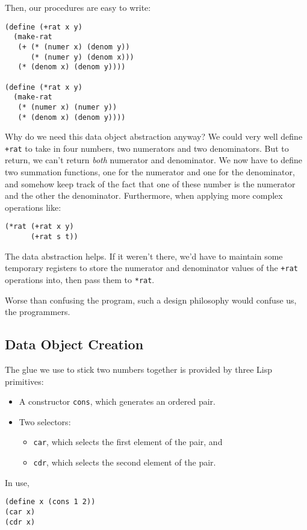 \documentclass[9pt]{report}
\begin{document}
Then, our procedures are easy to write:

\begin{verbatim}
(define (+rat x y)
  (make-rat
   (+ (* (numer x) (denom y))
      (* (numer y) (denom x)))
   (* (denom x) (denom y))))

(define (*rat x y)
  (make-rat
   (* (numer x) (numer y))
   (* (denom x) (denom y))))
\end{verbatim}

Why do we need this data object abstraction anyway? We could very
well define \texttt{+rat} to take in four numbers, two numerators and two
denominators. But to return, we can't return \emph{both} numerator and
denominator. We now have to define two summation functions, one for
the numerator and one for the denominator, and somehow keep track
of the fact that one of these number is the numerator and the other
the denominator. Furthermore, when applying more complex operations
like:

\begin{verbatim}
(*rat (+rat x y)
      (+rat s t))
\end{verbatim}

The data abstraction helps. If it weren't there, we'd have to
maintain some temporary registers to store the numerator and
denominator values of the \texttt{+rat} operations into, then pass them to
\texttt{*rat}.

Worse than confusing the program, such a design philosophy would
confuse us, the programmers.

\subsection{Data Object Creation}
\label{sec:orgc1541c7}

The glue we use to stick two numbers together is provided by three
Lisp primitives:
\begin{itemize}
\item A constructor \texttt{cons}, which generates an ordered pair.
\item Two selectors:
\begin{itemize}
\item \texttt{car}, which selects the first element of the pair, and
\item \texttt{cdr}, which selects the second element of the pair.
\end{itemize}
\end{itemize}

In use,
\begin{verbatim}
(define x (cons 1 2))
(car x)
(cdr x)
\end{verbatim}
\end{document}
